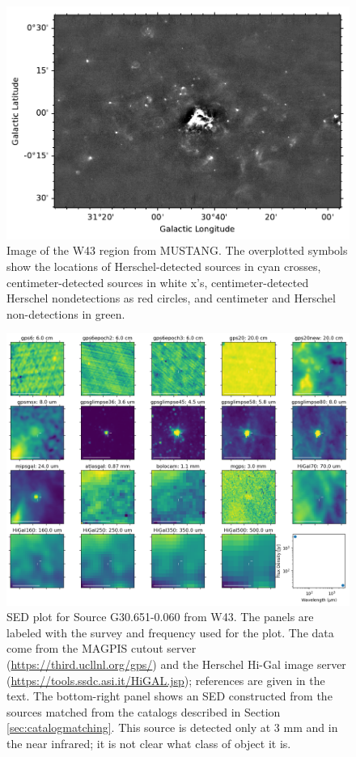\documentclass[twocolumn]{aastex62}
\begin{document}
\begin{figure}[htp]
    \includegraphics[width=17cm]{figures/W43_catalog_overlay.pdf}
\caption{Image of the W43 region from MUSTANG.  The overplotted symbols show the locations
of Herschel-detected sources in cyan crosses, centimeter-detected sources in white x's, centimeter-detected Herschel nondetections as red circles,
and centimeter and Herschel non-detections in green.}
\label{fig:w43overview}
\end{figure}

\begin{figure}[htp]
    \includegraphics[width=17cm]{figures/SED_plot_G031_177.png}
\caption{SED plot for Source  G30.651-0.060 from W43.  The panels are labeled with the
survey and frequency used for the plot.  The data come from the MAGPIS cutout
server (\url{https://third.ucllnl.org/gps/}) and the Herschel Hi-Gal image
server (\url{https://tools.ssdc.asi.it/HiGAL.jsp}); references are given in the
text.  The bottom-right panel shows an SED constructed from the sources matched
from the catalogs described in Section \ref{sec:catalogmatching}.
This source is detected only at 3 mm and in the near infrared; it is not clear
what class of object it is.
}
\label{fig:sed177}
\end{figure}
\end{document}
